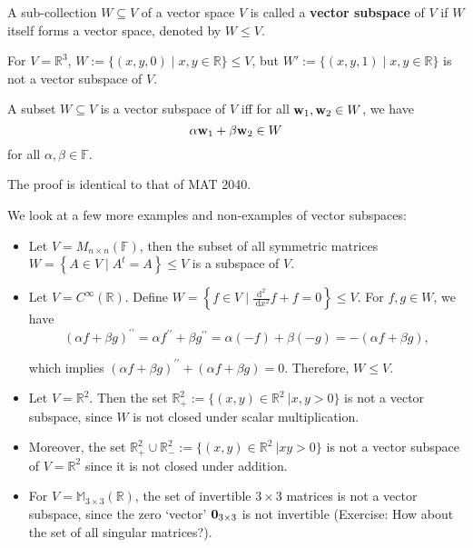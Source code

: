 \begin{definition} A sub-collection \(W \subseteq  V\) of a vector space \(V\) is called a {\bf vector subspace} of \(V\) if \(W\) itself forms a vector space, denoted by \(W \leq  V\).
\end{definition}

\begin{example} 
For \(V = {\mathbb{R}}^{3}\), \(W := \{ \left( {x,y,0}\right)  \mid  x,y \in  \mathbb{R}\}  \leq  V\), but \(W' := \{ \left( {x,y,1}\right)  \mid  x,y \in  \mathbb{R}\}\) is not a vector subspace of \(V\).
\end{example}

\begin{proposition}\label{prop:vecsubspceiff} A subset \(W \subseteq  V\) is a vector subspace of \(V\) iff for all \({\bf w}_1,{\bf w}_2 \in  W\), we have 
\[\alpha \mathbf{\bf w}_1 + \beta {\bf w}_2 \in  W\] 
for all \(\alpha ,\beta  \in  \mathbb{F}\).
\end{proposition}
The proof is identical to that of MAT 2040.


\begin{example} 
We look at a few more examples and non-examples of vector subspaces:
\begin{itemize}
    \item Let \(V = {M}_{n \times  n}\left( \mathbb{F}\right)\), then the subset of all symmetric matrices \(W = \left\{  A \in  V \mid  {A^t = A}\right\}   \leq  V\) is a subspace of $V$.

    \item Let \(V = {C}^{\infty }\left( \mathbb{R}\right)\). Define \(W = \left\{  {f \in  V \mid  \frac{{\mathrm{d}}^2}{\mathrm{\;d}{x}^2}f + f = 0}\right\}   \leq  V\). For \(f,g \in  W\), we have
\[
{\left( \alpha f + \beta g\right) }^{\prime \prime } = \alpha {f}^{\prime \prime } + \beta {g}^{\prime \prime } = \alpha \left( {-f}\right)  + \beta \left( {-g}\right)  =  - \left( {{\alpha f} + {\beta g}}\right) ,
\]

which implies \({\left( \alpha f + \beta g\right) }^{\prime \prime } + \left( {{\alpha f} + {\beta g}}\right)  = 0\). Therefore, $W \leq V$.

\item Let \(V = {\mathbb{R}}^2\). Then the set \( {\mathbb{R}}_{ + }^2 := \{(x,y) \in \mathbb{R}^2\ | x, y > 0\}\) is not a vector subspace, since \(W\) is not closed under scalar multiplication.

\item Moreover, the set \({\mathbb{R}}_{ + }^2 \cup {\mathbb{R}}_{ - }^2 := \{(x,y) \in \mathbb{R}^2\ | xy > 0\} \) is not a vector subspace of $V = \mathbb{R}^2$ since it is not closed under addition.

\item For \(V = {\mathbb{M}}_{3 \times  3}\left( \mathbb{R}\right)\), the set of invertible \(3 \times  3\) matrices is not a vector subspace, since the zero `vector' ${\bf0}_{3 \times 3}$ is not invertible (Exercise: How about the set of all singular matrices?).
\end{itemize}
\end{example}


